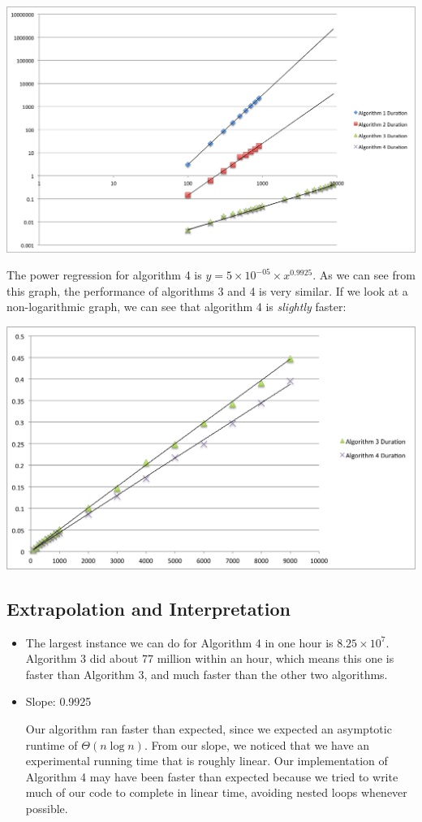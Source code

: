\documentclass[12pt,letterpaper]{article}
\begin{document}
\includegraphics[scale=0.75]{graph.png}

The power regression for algorithm 4 is $y = 5\times 10^{-05} \times x^{0.9925}$. As we can see from this graph, the performance of algorithms 3 and 4 is very similar. If we look at a non-logarithmic graph, we can see that algorithm 4 is \textit{slightly} faster:

\includegraphics[scale=0.85]{graph2.png}

\subsection{Extrapolation and Interpretation}

\begin{itemize}

\item The largest instance we can do for Algorithm 4 in one hour is $8.25\times 10^{7}$. Algorithm 3 did about 77 million within an hour, which means this one is faster than Algorithm 3, and much faster than the other two algorithms.

\item Slope: 0.9925

Our algorithm ran faster than expected, since we expected an asymptotic runtime of $\Theta(n\log{n})$. From our slope, we noticed that we have an experimental running time that is roughly linear. Our implementation of Algorithm 4 may have been faster than expected because we tried to write much of our code to complete in linear time, avoiding nested loops whenever possible.

\end{itemize}
\end{document}
